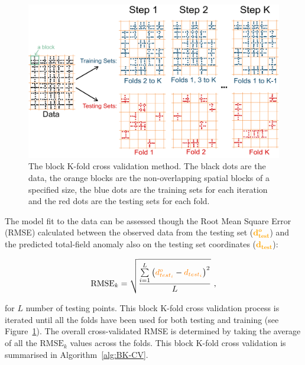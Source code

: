 \begin{figure}[tb]
  \centering
  \includegraphics[width=1\linewidth]{figures/bk_cv.png}
  \caption{
    The block K-fold cross validation method. The black dots are the data, the orange blocks are the non-overlapping spatial blocks of a specified size, the blue dots are the training sets for each iteration and the red dots are the testing sets for each fold.
    }
  \label{fig:BK-CV}
\end{figure}

The model fit to the data can be assessed though the Root Mean Square Error (RMSE) calculated between the observed data from the testing set (\textcolor{orange}{$\mathbf{d^o_{test}}$}) and the predicted total-field anomaly also on the testing set coordinates (\textcolor{orange}{$\mathbf{d_{test}}$}):

\begin{equation}
    \label{eq:rmse}
    \text{RMSE}_k = \sqrt{\dfrac{\sum\limits_{i=1}^L \left(\textcolor{orange}{{d^o_{test_i}}} - \textcolor{orange}{{d_{test_i}}}\right)^2}{L}}
    \ ,
\end{equation}

\noindent
for $L$ number of testing points. This block K-fold cross validation process is iterated until all the folds have been used for both testing and training (see Figure~\ref{fig:BK-CV}). The overall cross-validated RMSE is determined by taking the average of all the $\text{RMSE}_k$ values across the folds. This block K-fold cross validation is summarised in Algorithm~\ref{alg:BK-CV}.

